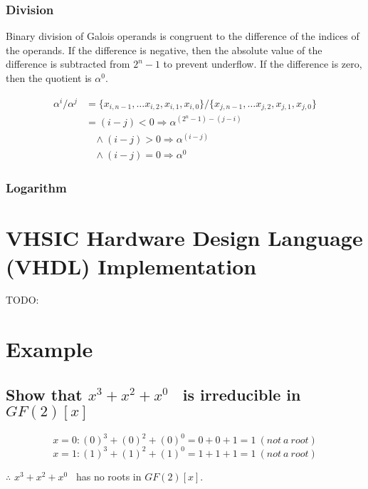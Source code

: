 \documentclass[paper=usletter, fontsize=12pt]{article}
\newcommand{\polynomial}{$x^{3}+x^{2}+x^{0}$}
\begin{document}
            \subsubsection{Division}
            Binary division of Galois operands is congruent to the difference of the indices of the operands. If the difference is negative, then the absolute value of the difference is subtracted from $2^{n}-1$ to prevent underflow. If the difference is zero, then the quotient is $\alpha^{0}$.

                \begin{equation*}
                    \begin{split}
                        \alpha^{i} / \alpha^{j} & = \{x_{i, n-1},\ldots x_{i, 2},x_{i, 1},x_{i, 0}\} / \{x_{j, n-1}, \ldots x_{j, 2}, x_{j, 1}, x_{j, 0}\} \\
                        & = (i - j) < 0 \Longrightarrow \alpha^{(2^{n}-1) - (j - i)} \\
                        & \ \ \ \ \wedge (i - j) > 0 \Longrightarrow \alpha^{(i - j)} \\
                        & \ \ \ \ \wedge (i - j) = 0 \Longrightarrow \alpha^{0}
                    \end{split}
                \end{equation*}

            \subsubsection{Logarithm}

            \newpage

    \section{VHSIC Hardware Design Language (VHDL) Implementation}
    TODO:

    \section{Example}
        \subsection{Show that \polynomial~ is irreducible in $GF(2)[x]$}

            \[ x=0: (0)^{3}+(0)^{2}+(0)^{0}=0+0+1=1 \ (not \ a \ root) \]
            \[ x=1: (1)^{3}+(1)^{2}+(1)^{0}=1+1+1=1 \ (not \ a \ root) \]
            \centerline{$\therefore$ \polynomial~ has no roots in $GF(2)[x]$.}
\end{document}
